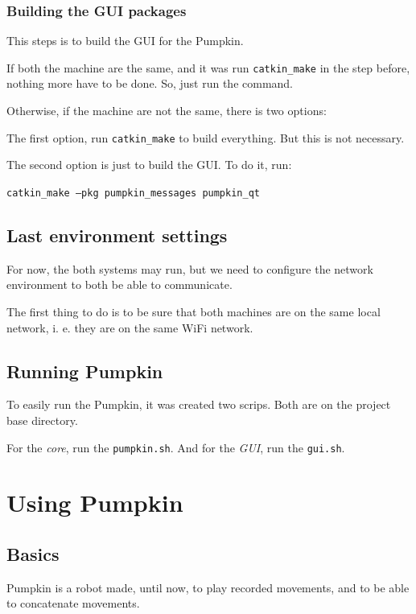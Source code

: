 \documentclass[oneside,a4paper,titlepage]{article}
\begin{document}
\subsubsection{Building the GUI packages}

This steps is to build the GUI for the Pumpkin.

If both the machine are the same, and it was run \texttt{catkin\_make} in the step before, nothing more have to be done. So, just run the command.

Otherwise, if the machine are not the same, there is two options:

The first option, run \texttt{catkin\_make} to build everything. But this is not necessary.

The second option is just to build the GUI. To do it, run:

\begin{center}
\texttt{catkin\_make --pkg pumpkin\_messages pumpkin\_qt}
\end{center}

\subsection{Last environment settings}

For now, the both systems may run, but we need to configure the network environment to both be able to communicate.

The first thing to do is to be sure that both machines are on the same local network, i. e. they are on the same WiFi network.

\subsection{Running Pumpkin}
\label{sec:run}
To easily run the Pumpkin, it was created two scrips. Both are on the project base directory.

For the \emph{core}, run the \texttt{pumpkin.sh}. And for the \emph{GUI}, run the \texttt{gui.sh}.

\newpage
\section{Using Pumpkin}

\subsection{Basics}

Pumpkin is a robot made, until now, to play recorded movements, and to be able to concatenate movements.
\end{document}

